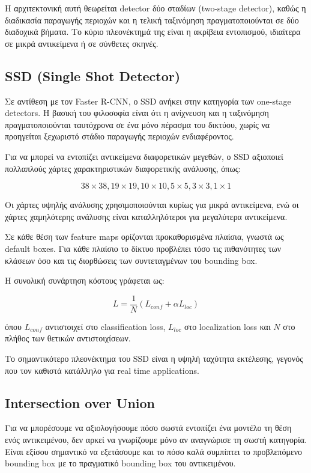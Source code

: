 \documentclass[12pt]{article}
\begin{document}
Η αρχιτεκτονική αυτή θεωρείται detector δύο σταδίων (two-stage detector), καθώς η διαδικασία παραγωγής περιοχών και η τελική ταξινόμηση πραγματοποιούνται 
σε δύο διαδοχικά βήματα. Το κύριο πλεονέκτημά της είναι η ακρίβεια εντοπισμού, ιδιαίτερα σε μικρά αντικείμενα ή σε σύνθετες σκηνές.

\subsection{SSD (Single Shot Detector)}

Σε αντίθεση με τον Faster R-CNN, ο SSD ανήκει στην κατηγορία των one-stage detectors. Η βασική του φιλοσοφία είναι ότι η ανίχνευση και η ταξινόμηση 
πραγματοποιούνται ταυτόχρονα σε ένα μόνο πέρασμα του δικτύου, χωρίς να προηγείται ξεχωριστό στάδιο παραγωγής περιοχών ενδιαφέροντος.

Για να μπορεί να εντοπίζει αντικείμενα διαφορετικών μεγεθών, ο SSD αξιοποιεί πολλαπλούς χάρτες χαρακτηριστικών διαφορετικής ανάλυσης, όπως:

\[
38\times38,
19\times19,
10\times10,
5\times5,
3\times3,
1\times1
\]

Οι χάρτες υψηλής ανάλυσης χρησιμοποιούνται κυρίως για μικρά αντικείμενα, ενώ οι χάρτες χαμηλότερης ανάλυσης είναι καταλληλότεροι για μεγαλύτερα 
αντικείμενα.

Σε κάθε θέση των feature maps ορίζονται προκαθορισμένα πλαίσια, γνωστά ως default boxes. Για κάθε πλαίσιο το δίκτυο προβλέπει τόσο τις πιθανότητες 
των κλάσεων όσο και τις διορθώσεις των συντεταγμένων του bounding box.

Η συνολική συνάρτηση κόστους γράφεται ως:

\[
L=
\frac{1}{N}
\left(
L_{conf}
+
\alpha L_{loc}
\right)
\]

όπου $L_{conf}$ αντιστοιχεί στο classification loss, $L_{loc}$ στο localization loss και $N$ στο πλήθος των θετικών αντιστοιχίσεων.

Το σημαντικότερο πλεονέκτημα του SSD είναι η υψηλή ταχύτητα εκτέλεσης, γεγονός που τον καθιστά κατάλληλο για real time applications.


\subsection{Intersection over Union}

Για να μπορέσουμε να αξιολογήσουμε πόσο σωστά εντοπίζει ένα μοντέλο τη θέση ενός αντικειμένου, δεν αρκεί να γνωρίζουμε μόνο αν αναγνώρισε τη 
σωστή κατηγορία. Είναι εξίσου σημαντικό να εξετάσουμε και το πόσο καλά συμπίπτει το προβλεπόμενο bounding box με το πραγματικό bounding box του 
αντικειμένου.
\end{document}
